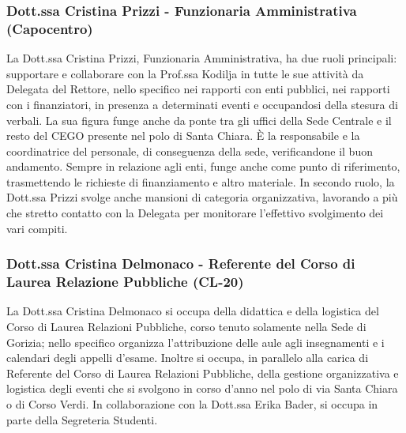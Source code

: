         \subsubsection{Dott.ssa Cristina Prizzi - Funzionaria Amministrativa (Capocentro)}
            La Dott.ssa Cristina Prizzi, Funzionaria Amministrativa, ha due ruoli principali: supportare e collaborare con la Prof.ssa Kodilja in tutte le sue attività da Delegata del Rettore, nello specifico nei rapporti con enti pubblici, nei rapporti con i finanziatori, in presenza a determinati eventi e occupandosi della stesura di verbali. La sua figura funge anche da ponte tra gli uffici della Sede Centrale e il resto del CEGO presente nel polo di Santa Chiara. È la responsabile e la coordinatrice del personale, di conseguenza della sede, verificandone il buon andamento. Sempre in relazione agli enti, funge anche come punto di riferimento, trasmettendo le richieste di finanziamento e altro materiale. \newline
            In secondo ruolo, la Dott.ssa Prizzi svolge anche mansioni di categoria organizzativa, lavorando a più che stretto contatto con la Delegata per monitorare l'effettivo svolgimento dei vari compiti.
        \subsubsection{Dott.ssa Cristina Delmonaco - Referente del Corso di Laurea Relazione Pubbliche (CL-20)}
            La Dott.ssa Cristina Delmonaco si occupa della didattica e della logistica del Corso di Laurea Relazioni Pubbliche, corso tenuto solamente nella Sede di Gorizia; nello specifico organizza l'attribuzione delle aule agli insegnamenti e i calendari degli appelli d'esame. \newline
            Inoltre si occupa, in parallelo alla carica di Referente del Corso di Laurea Relazioni Pubbliche, della gestione organizzativa e logistica degli eventi che si svolgono in corso d'anno nel polo di via Santa Chiara o di Corso Verdi. \newline
            In collaborazione con la Dott.ssa Erika Bader, si occupa in parte della Segreteria Studenti. 
